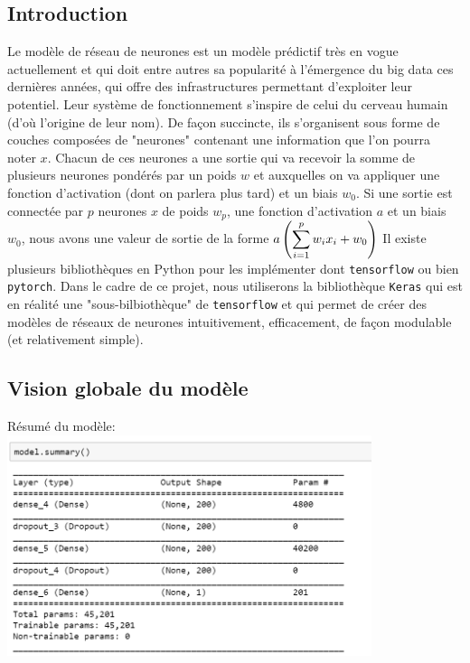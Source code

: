 \documentclass[a4paper,oneside,11pt]{article}
\newcommand{\ds}{\ensuremath{\displaystyle}}
\begin{document}
\subsection*{Introduction}
%
\qquad Le modèle de réseau de neurones est un modèle prédictif très en vogue actuellement et qui doit entre autres sa popularité à l'émergence du big data ces dernières années, qui offre des infrastructures permettant d'exploiter leur potentiel. Leur système de fonctionnement s'inspire de celui du cerveau humain (d'où l'origine de leur nom). De façon succincte, ils s'organisent sous forme de couches composées de "neurones" contenant une information que l'on pourra noter $x$. Chacun de ces neurones a une sortie qui va recevoir la somme de plusieurs neurones pondérés par un poids $w$ et auxquelles on va appliquer une fonction d'activation (dont on parlera plus tard) et un biais $w_0$. Si une sortie est connectée par $p$ neurones $x$ de poids $w_p$, une fonction d'activation $a$ et un biais $w_0$, nous avons une valeur de sortie de la forme $\ds{a\left( \sum_{i=1}^{p} w_i x_i + w_0\right)} $ \newline
Il existe plusieurs bibliothèques en Python pour les implémenter dont \verb+tensorflow+ ou bien \verb+pytorch+. Dans le cadre de ce projet, nous utiliserons la bibliothèque  \verb+Keras+ qui est en réalité une "sous-bilbiothèque" de \verb+tensorflow+ et qui permet de créer des modèles de réseaux de neurones intuitivement, efficacement, de façon modulable (et relativement simple).
\subsection*{Vision globale du modèle}
%
Résumé du modèle: \newline
\includegraphics[width=0.8\textwidth]{image_rapport/NNmodelsummary}
\end{document}
